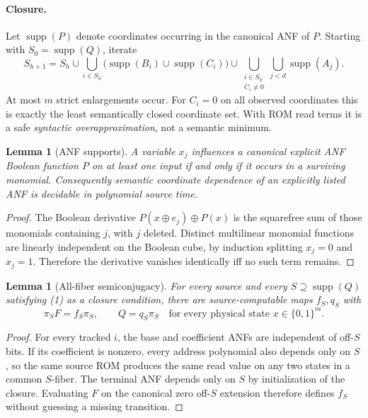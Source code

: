 \documentclass[11pt]{article}
\newtheorem{lemma}[theorem]{Lemma}
\newcommand{\supp}{\operatorname{supp}}
\begin{document}
\paragraph{Closure.} Let $\supp(P)$ denote coordinates occurring in the canonical ANF of $P$. Starting with $S_0=\supp(Q)$, iterate
\[
 S_{h+1}=S_h\cup\bigcup_{i\in S_h}\bigl(\supp(B_i)\cup\supp(C_i)\bigr)
 \cup\bigcup_{\substack{i\in S_h\\C_i\ne0}}\bigcup_{j<d}\supp(A_j).
\tag{1}
\]
At most $m$ strict enlargements occur. For $C_i=0$ on all observed coordinates this is exactly the least semantically closed coordinate set. With ROM read terms it is a safe \emph{syntactic overapproximation}, not a semantic minimum.
\begin{lemma}[ANF supports]
A variable $x_j$ influences a canonical explicit ANF Boolean function $P$ on at least one input if and only if it occurs in a surviving monomial. Consequently semantic coordinate dependence of an explicitly listed ANF is decidable in polynomial source time.
\end{lemma}
\begin{proof}
The Boolean derivative $P(x\oplus e_j)\oplus P(x)$ is the squarefree sum of those monomials containing $j$, with $j$ deleted. Distinct multilinear monomial functions are linearly independent on the Boolean cube, by induction splitting $x_j=0$ and $x_j=1$. Therefore the derivative vanishes identically iff no such term remains.
\end{proof}
\begin{lemma}[All-fiber semiconjugacy]
For every source and every $S\supseteq\supp(Q)$ satisfying (1) as a closure condition, there are source-computable maps $f_S,q_S$ with
\[
 \pi_S F=f_S\pi_S,\qquad Q=q_S\pi_S
 \quad\text{for every physical state }x\in\{0,1\}^m.
\tag{2}
\]
\end{lemma}
\begin{proof}
For every tracked $i$, the base and coefficient ANFs are independent of off-$S$ bits. If its coefficient is nonzero, every address polynomial also depends only on $S$, so the same source ROM produces the same read value on any two states in a common $S$-fiber. The terminal ANF depends only on $S$ by initialization of the closure. Evaluating $F$ on the canonical zero off-$S$ extension therefore defines $f_S$ without guessing a missing transition.
\end{proof}
\end{document}
